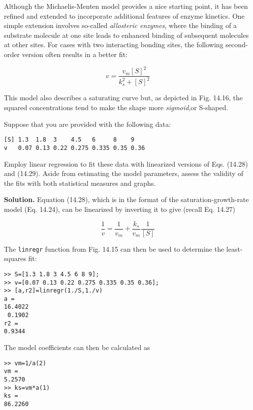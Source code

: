 \documentclass[../main.tex]{subfiles}
\begin{document}
Although the Michaelis-Menten model provides a nice starting point, it has been refined and extended to incorporate additional features of enzyme kinetics. One simple extension involves so-called \textit{allosteric enzymes}, where the binding of a substrate molecule at one site leads to enhanced binding of subsequent molecules at other sites. For cases with two interacting bonding sites, the following second-order version often results in a better fit:

\begin{equation}
	v = \frac{v_m {[S]}^2}{k^2_s + {[S]}^2}
\end{equation}

\noindent This model also describes a saturating curve but, as depicted in Fig. 14.16, the squared concentrations tend to make the shape more \textit{sigmoid},or S-shaped.

Suppose that you are provided with the following data:
\begin{lstlisting}[numbers=none] 
[S] 1.3  1.8  3    4.5   6     8    9
v   0.07 0.13 0.22 0.275 0.335 0.35 0.36
\end{lstlisting}

\noindent Employ linear regression to fit these data with linearized versions of Eqs. (14.28) and (14.29). Aside from estimating the model parameters, assess the validity of the fits with both statistical measures and graphs.

\textbf{Solution.} Equation (14.28), which is in the format of the saturation-growth-rate model (Eq. 14.24), can be linearized by inverting it to give (recall Eq. 14.27)

\begin{equation}
	\frac{1}{v} = \frac{1}{v_m} + \frac{k_s}{v_m} \frac{1}{[S]}
\end{equation}

\noindent The \texttt{linregr} function from Fig. 14.15 can then be used to determine the least-squares fit:

\begin{lstlisting}[numbers=none] 
>> S=[1.3 1.8 3 4.5 6 8 9];
>> v=[0.07 0.13 0.22 0.275 0.335 0.35 0.36];
>> [a,r2]=linregr(1./S,1./v)
a =
16.4022
 0.1902
r2 =
0.9344
\end{lstlisting}

\noindent The model coefficients can then be calculated as

\begin{lstlisting}[numbers=none] 
>> vm=1/a(2)
vm =
5.2570
>> ks=vm*a(1)
ks =
86.2260
\end{lstlisting}
\end{document}
